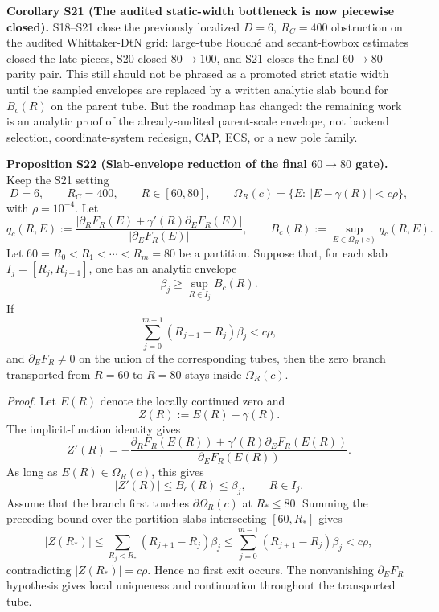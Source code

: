 \documentclass[aps,prd,onecolumn,notitlepage,nofootinbib,superscriptaddress,11pt,floatfix]{revtex4-2}
\begin{document}
\medskip\noindent\textbf{Corollary S21 (The audited static-width bottleneck is now piecewise closed).}
S18--S21 close the previously localized \(D=6,\ R_C=400\) obstruction on the
audited Whittaker-DtN grid: large-tube Rouché and secant-flowbox estimates
closed the late pieces, S20 closed \(80\to100\), and S21 closes the final
\(60\to80\) parity pair.  This still should not be phrased as a promoted
strict static width until the sampled envelopes are replaced by a written
analytic slab bound for \(B_c(R)\) on the parent tube.  But the roadmap has
changed: the remaining work is an analytic proof of the already-audited
parent-scale envelope, not backend selection, coordinate-system redesign, CAP,
ECS, or a new pole family.

\medskip\noindent\textbf{Proposition S22 (Slab-envelope reduction of the final \(60\to80\) gate).}
Keep the S21 setting
\[
D=6,\qquad R_C=400,\qquad R\in[60,80],
\qquad \Omega_R(c)=\{E:\ |E-\gamma(R)|<c\rho\},
\]
with \(\rho=10^{-4}\).  Let
\[
q_c(R,E):=
\frac{|\partial_RF_R(E)+\gamma'(R)\partial_EF_R(E)|}
     {|\partial_EF_R(E)|},
\qquad
B_c(R):=\sup_{E\in\Omega_R(c)} q_c(R,E).
\]
Let \(60=R_0<R_1<\cdots<R_m=80\) be a partition.  Suppose that, for each
slab \(I_j=[R_j,R_{j+1}]\), one has an analytic envelope
\[
\beta_j\ge \sup_{R\in I_j}B_c(R).
\]
If
\[
\sum_{j=0}^{m-1}(R_{j+1}-R_j)\beta_j<c\rho,
\]
and \(\partial_EF_R\ne0\) on the union of the corresponding tubes, then the
zero branch transported from \(R=60\) to \(R=80\) stays inside
\(\Omega_R(c)\).

\emph{Proof.}
Let \(E(R)\) denote the locally continued zero and
\[
Z(R):=E(R)-\gamma(R).
\]
The implicit-function identity gives
\[
Z'(R)=-
\frac{\partial_RF_R(E(R))+\gamma'(R)\partial_EF_R(E(R))}
     {\partial_EF_R(E(R))}.
\]
As long as \(E(R)\in\Omega_R(c)\), this gives
\[
|Z'(R)|\le B_c(R)\le \beta_j,\qquad R\in I_j.
\]
Assume that the branch first touches \(\partial\Omega_R(c)\) at
\(R_\ast\le80\).  Summing the preceding bound over the partition slabs
intersecting \([60,R_\ast]\) gives
\[
|Z(R_\ast)|
\le \sum_{R_j<R_\ast}(R_{j+1}-R_j)\beta_j
\le \sum_{j=0}^{m-1}(R_{j+1}-R_j)\beta_j
<c\rho,
\]
contradicting \(|Z(R_\ast)|=c\rho\).  Hence no first exit occurs.  The
nonvanishing \(\partial_EF_R\) hypothesis gives local uniqueness and
continuation throughout the transported tube.
\end{document}
